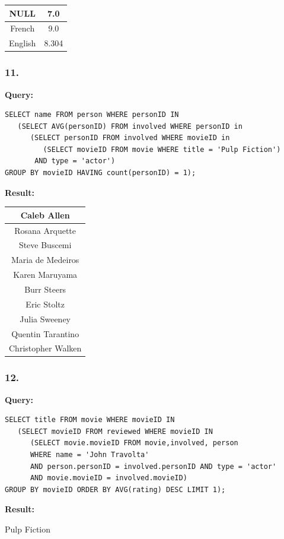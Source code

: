 \documentclass[10pt,a4paper,final]{report}
\begin{document}
\begin{tabular}{|c|c|}
\hline 
NULL & 7.0 \\ 
\hline 
French & 9.0 \\ 
\hline 
English & 8.304 \\ 
\hline 
\end{tabular} 

\subsubsection*{11.}
\textbf{Query:}
\begin{lstlisting}
SELECT name FROM person WHERE personID IN 
   (SELECT AVG(personID) FROM involved WHERE personID in 
      (SELECT personID FROM involved WHERE movieID in 
         (SELECT movieID FROM movie WHERE title = 'Pulp Fiction') 
       AND type = 'actor') 
GROUP BY movieID HAVING count(personID) = 1);
\end{lstlisting}
\textbf{Result:}

\begin{tabular}{|c|}
\hline 
Caleb Allen \\ 
\hline 
Rosana Arquette \\ 
\hline 
Steve Buscemi \\ 
\hline 
Maria de Medeiros \\ 
\hline 
Karen Maruyama \\ 
\hline 
Burr Steers \\ 
\hline 
Eric Stoltz \\ 
\hline 
Julia Sweeney \\ 
\hline 
Quentin Tarantino \\ 
\hline 
Christopher Walken \\ 
\hline 
\end{tabular} 

\subsubsection*{12.}
\textbf{Query:}
\begin{lstlisting}
SELECT title FROM movie WHERE movieID IN 
   (SELECT movieID FROM reviewed WHERE movieID IN 
      (SELECT movie.movieID FROM movie,involved, person 
      WHERE name = 'John Travolta' 
      AND person.personID = involved.personID AND type = 'actor' 
      AND movie.movieID = involved.movieID) 
GROUP BY movieID ORDER BY AVG(rating) DESC LIMIT 1);
\end{lstlisting}
\textbf{Result:}

Pulp Fiction
\end{document}
